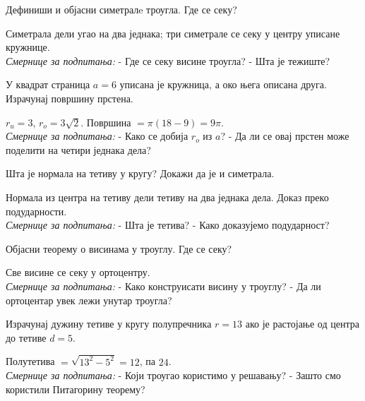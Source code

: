 \documentclass[11pt,a5paper,twoside,addpoints,answers]{exam}
\begin{document}
\begin{questions}
\question Дефиниши и објасни симетралe троугла. Где се секу?
\begin{solution}
Симетрала дели угао на два једнака; три симетрале се секу у центру уписане кружнице.  
\\[0.5em]
\textit{Смернице за подпитања:}  
- Где се секу висине троугла?  
- Шта је тежиште?  
\end{solution}

\question У квадрат страница $a=6$ уписана је кружница, а око њега описана друга. Израчунај површину прстена.
\begin{solution}
$r_u=3$, $r_o=3\sqrt2$. Површина $=\pi(18-9)=9\pi$.  
\\[0.5em]
\textit{Смернице за подпитања:}  
- Како се добија $r_o$ из $a$?  
- Да ли се овај прстен може поделити на четири једнака дела?  
\end{solution}

\question Шта је нормала на тетиву у кругу? Докажи да је и симетрала.
\begin{solution}
Нормала из центра на тетиву дели тетиву на два једнака дела. Доказ преко подударности.  
\\[0.5em]
\textit{Смернице за подпитања:}  
- Шта је тетива?  
- Како доказујемо подударност?  
\end{solution}

\question Објасни теорему о висинама у троуглу. Где се секу?
\begin{solution}
Све висине се секу у ортоцентру.  
\\[0.5em]
\textit{Смернице за подпитања:}  
- Како конструисати висину у троуглу?  
- Да ли ортоцентар увек лежи унутар троугла?  
\end{solution}

\question Израчунај дужину тетиве у кругу полупречника $r=13$ ако је растојање од центра до тетиве $d=5$.
\begin{solution}
Полутетива $=\sqrt{13^2-5^2}=12$, па $24$.  
\\[0.5em]
\textit{Смернице за подпитања:}  
- Који троугао користимо у решавању?  
- Зашто смо користили Питагорину теорему?  
\end{solution}

\end{questions}
\end{document}
